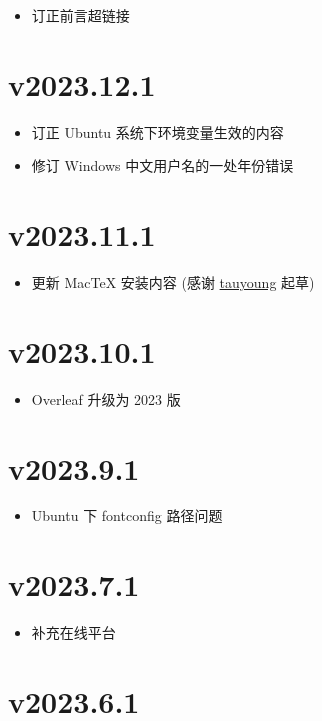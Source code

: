 \begin{itemize}
  \item 订正前言超链接
\end{itemize}

\section*{v2023.12.1}

\begin{itemize}
  \item 订正 Ubuntu 系统下环境变量生效的内容
  \item 修订 Windows 中文用户名的一处年份错误
\end{itemize}

\section*{v2023.11.1}

\begin{itemize}
  \item 更新 MacTeX 安装内容 (感谢 \href{https://github.com/tauyoungsama}{tauyoung} 起草)
\end{itemize}

\section*{v2023.10.1}

\begin{itemize}
  \item Overleaf 升级为 2023 版
\end{itemize}

\section*{v2023.9.1}

\begin{itemize}
  \item Ubuntu 下 fontconfig 路径问题
\end{itemize}

\section*{v2023.7.1}

\begin{itemize}
  \item 补充在线平台
\end{itemize}

\section*{v2023.6.1}

